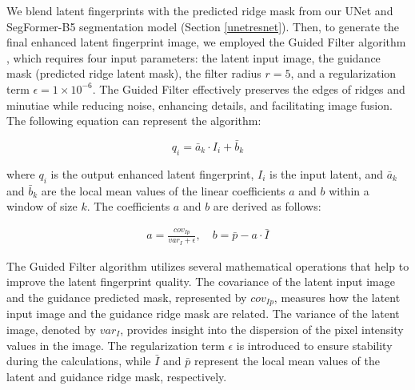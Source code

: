 \documentclass[twocolumn, switch]{article} %
\begin{document}

We blend latent fingerprints with the predicted ridge mask from our UNet and SegFormer-B5 segmentation model (Section \ref{unetresnet}). Then, to generate the final enhanced latent fingerprint image, we employed the Guided Filter algorithm \cite{6319316}, which requires four input parameters: the latent input image, the guidance mask (predicted ridge latent mask), the filter radius $r = 5$, and a regularization term $\epsilon = 1 \times 10^{-6}$. The Guided Filter effectively preserves the edges of ridges and minutiae while reducing noise, enhancing details, and facilitating image fusion. The following equation can represent the algorithm:

\begin{equation}
q_i = \bar{a}_k \cdot I_i + \bar{b}_k
\end{equation}

where $q_i$ is the output enhanced latent fingerprint, $I_i$ is the input latent, and $\bar{a}_k$ and $\bar{b}_k$ are the local mean values of the linear coefficients $a$ and $b$ within a window of size $k$. The coefficients $a$ and $b$ are derived as follows:

\begin{align}
a = \frac{cov_{Ip}}{var_I + \epsilon}, \quad
b = \bar{p} - a \cdot \bar{I}
\end{align}


The Guided Filter algorithm utilizes several mathematical operations that help to improve the latent fingerprint quality. The covariance of the latent input image and the guidance predicted mask, represented by $cov_{Ip}$, measures how the latent input image and the guidance ridge mask are related. The variance of the latent image, denoted by $var_I$, provides insight into the dispersion of the pixel intensity values in the image. The regularization term $\epsilon$ is introduced to ensure stability during the calculations, while $\bar{I}$ and $\bar{p}$ represent the local mean values of the latent and guidance ridge mask, respectively.
\end{document}
